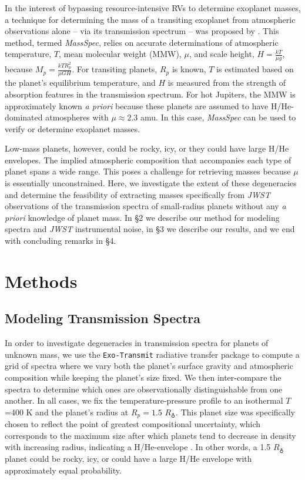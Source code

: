 \documentclass[iop]{emulateapj}
\begin{document}
In the interest of bypassing resource-intensive RVs to determine exoplanet masses, a technique for determining the mass of a transiting exoplanet from atmospheric observations alone -- via its transmission spectrum -- was proposed by \citet{dew13}.  This method, termed \emph{MassSpec}, relies on accurate determinations of atmospheric temperature, $T$, mean molecular weight (MMW), $\mu$, and scale height, $H= \frac{kT}{\mu g}$, because $M_p=\frac{kTR_p^2}{\mu GH}$. For transiting planets, $R_p$ is known, $T$ is estimated based on the planet's equilibrium temperature, and $H$ is measured from the strength of absorption features in the transmission spectrum.  For hot Jupiters, the MMW is approximately known \emph{a priori} because these planets are assumed to have H/He-dominated atmospheres with $\mu\approx2.3$ amu. In this case, \emph{MassSpec} can be used to verify or determine exoplanet masses.  

Low-mass planets, however, could be rocky, icy, or they could have large H/He envelopes. The implied atmospheric composition that accompanies each type of planet spans a wide range.  This poses a challenge for retrieving masses because $\mu$ is essentially unconstrained. Here, we investigate the extent of these degeneracies and determine the feasibility of extracting masses specifically from \emph{JWST} observations of the transmission spectra of small-radius planets without any \emph{a priori} knowledge of planet mass. In \S2 we describe our method for modeling spectra and \emph{JWST} instrumental noise, in \S3 we describe our results, and we end with concluding remarks in \S4.


\section{Methods}

\subsection{Modeling Transmission Spectra \label{sec:model_spectra}}

In order to investigate degeneracies in transmission spectra for planets of unknown mass, we use the \texttt{Exo-Transmit} radiative transfer package \citep{kem16} to compute a grid of spectra where we vary both the planet's surface gravity and atmospheric composition while keeping the planet's size fixed.  We then inter-compare the spectra to determine which ones are observationally distinguishable from one another.  In all cases, we fix the temperature-pressure profile to an isothermal $T$=400 K and the planet's radius at $R_p = 1.5$  $R_\earth$. This planet size was specifically chosen to reflect the point of greatest compositional uncertainty, which corresponds to the maximum size after which planets tend to decrease in density with increasing radius, indicating a H/He-envelope \citep{wei14,rog15}. In other words, a 1.5 $R_\earth$ planet could be rocky, icy, or could have a large H/He envelope with approximately equal probability. 
\end{document}
